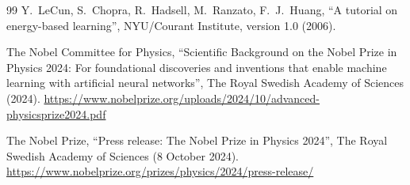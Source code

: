 \documentclass[12pt]{article}
\begin{document}
\begin{thebibliography}{99}
Y.~LeCun, S.~Chopra, R.~Hadsell, M.~Ranzato, F.~J.~Huang,
``A tutorial on energy-based learning'',
NYU/Courant Institute, version 1.0 (2006).

The Nobel Committee for Physics,
``Scientific Background on the Nobel Prize in Physics 2024: For foundational discoveries and inventions that enable machine learning with artificial neural networks'',
The Royal Swedish Academy of Sciences (2024).
\url{https://www.nobelprize.org/uploads/2024/10/advanced-physicsprize2024.pdf}

The Nobel Prize,
``Press release: The Nobel Prize in Physics 2024'',
The Royal Swedish Academy of Sciences (8 October 2024).
\url{https://www.nobelprize.org/prizes/physics/2024/press-release/}

\end{thebibliography}
\end{document}

